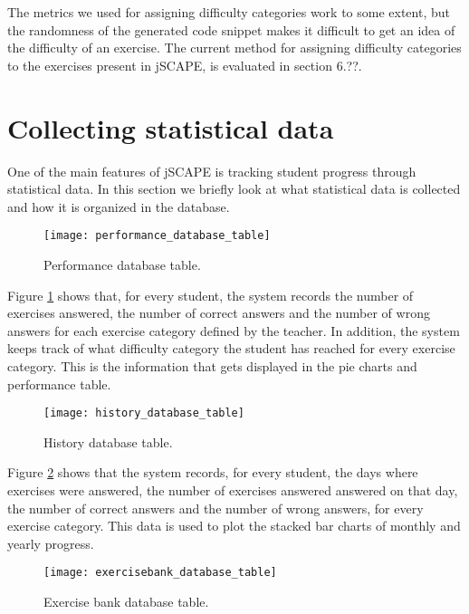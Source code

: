 The metrics we used for assigning difficulty categories work to some extent, but the randomness of the generated code snippet makes it difficult to get an idea of the difficulty of an exercise. The current method for assigning difficulty categories to the exercises present in jSCAPE, is evaluated in section 6.??.

\section{Collecting statistical data}
One of the main features of jSCAPE is tracking student progress through statistical data. In this section we briefly look at what statistical data is collected and how it is organized in the database. \newline

\begin{figure}[H]
\centering
\texttt{[image: performance\_database\_table]}
\caption{Performance database table.}
\label{fig:performance_database_table}
\end{figure}

Figure \ref{fig:performance_database_table} shows that, for every student, the system records the number of exercises answered, the number of correct answers and the number of wrong answers for each exercise category defined by the teacher. In addition, the system keeps track of what difficulty category the student has reached for every exercise category. This is the information that gets displayed in the pie charts and performance table.

\begin{figure}[H]
\centering
\texttt{[image: history\_database\_table]}
\caption{History database table.}
\label{fig:history_database_table}
\end{figure}

Figure \ref{fig:history_database_table} shows that the system records, for every student, the days where exercises were answered, the number of exercises answered answered on that day, the number of correct answers and the number of wrong answers, for every exercise category. This data is used to plot the stacked bar charts of monthly and yearly progress.

\begin{figure}[H]
\centering
\texttt{[image: exercisebank\_database\_table]}
\caption{Exercise bank database table.}
\label{fig:exercisebank_database_table}
\end{figure}

